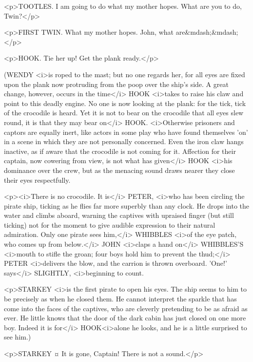 \begin{drama}

<p>TOOTLES. I am going to do what my mother hopes. What are you to do, Twin?</p>

<p>FIRST TWIN. What my mother hopes. John, what are&mdash;&mdash;</p>

<p>HOOK. Tie her up! Get the plank ready.</p>

\begin{stagedir}
(WENDY <i>is roped to the mast; but no one regards her, for all eyes are fixed upon the plank now protruding from the poop over the ship's side. A great change, however, occurs in the time</i> HOOK <i>takes to raise his claw and point to this deadly engine. No one is now looking at the plank: for the tick, tick of the crocodile is heard. Yet it is not to bear on the crocodile that all eyes slew round, it is that they may bear on</i> HOOK. <i>Otherwise prisoners and captors are equally inert, like actors in some play who have found themselves 'on' in a scene in which they are not personally concerned. Even the iron claw hangs inactive, as if aware that the crocodile is not coming for it. Affection for their captain, now cowering from view, is not what has given</i> HOOK <i>his dominance over the crew, but as the menacing sound draws nearer they close their eyes respectfully.

<p><i>There is no crocodile. It is</i> PETER, <i>who has been circling the pirate ship, ticking as he flies far more superbly than any clock. He drops into the water and climbs aboard, warning the captives with upraised finger (but still ticking) not for the moment to give audible expression to their natural admiration. Only one pirate sees him,</i> WHIBBLES <i>of the eye patch, who comes up from below.</i> JOHN <i>claps a hand on</i> WHIBBLES'S <i>mouth to stifle the groan; four boys hold him to prevent the thud;</i> PETER <i>delivers the blow, and the carrion is thrown overboard. 'One!' says</i> SLIGHTLY, <i>beginning to count.

<p>STARKEY <i>is the first pirate to open his eyes. The ship seems to him to be precisely as when he closed them. He cannot interpret the sparkle that has come into the faces of the captives, who are cleverly pretending to be as afraid as ever. He little knows that the door of the dark cabin has just closed on one more boy. Indeed it is for</i> HOOK<i>alone he looks, and he is a little surprised to see him.)
\end{stagedir}

<p>STARKEY ¤
It is gone, Captain! There is not a sound.</p>


\end{drama}
